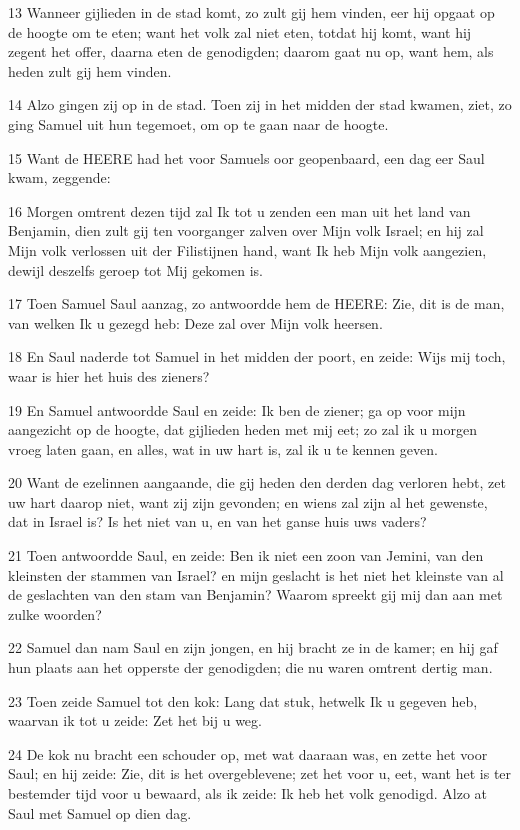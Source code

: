\par 13 Wanneer gijlieden in de stad komt, zo zult gij hem vinden, eer hij opgaat op de hoogte om te eten; want het volk zal niet eten, totdat hij komt, want hij zegent het offer, daarna eten de genodigden; daarom gaat nu op, want hem, als heden zult gij hem vinden.
\par 14 Alzo gingen zij op in de stad. Toen zij in het midden der stad kwamen, ziet, zo ging Samuel uit hun tegemoet, om op te gaan naar de hoogte.
\par 15 Want de HEERE had het voor Samuels oor geopenbaard, een dag eer Saul kwam, zeggende:
\par 16 Morgen omtrent dezen tijd zal Ik tot u zenden een man uit het land van Benjamin, dien zult gij ten voorganger zalven over Mijn volk Israel; en hij zal Mijn volk verlossen uit der Filistijnen hand, want Ik heb Mijn volk aangezien, dewijl deszelfs geroep tot Mij gekomen is.
\par 17 Toen Samuel Saul aanzag, zo antwoordde hem de HEERE: Zie, dit is de man, van welken Ik u gezegd heb: Deze zal over Mijn volk heersen.
\par 18 En Saul naderde tot Samuel in het midden der poort, en zeide: Wijs mij toch, waar is hier het huis des zieners?
\par 19 En Samuel antwoordde Saul en zeide: Ik ben de ziener; ga op voor mijn aangezicht op de hoogte, dat gijlieden heden met mij eet; zo zal ik u morgen vroeg laten gaan, en alles, wat in uw hart is, zal ik u te kennen geven.
\par 20 Want de ezelinnen aangaande, die gij heden den derden dag verloren hebt, zet uw hart daarop niet, want zij zijn gevonden; en wiens zal zijn al het gewenste, dat in Israel is? Is het niet van u, en van het ganse huis uws vaders?
\par 21 Toen antwoordde Saul, en zeide: Ben ik niet een zoon van Jemini, van den kleinsten der stammen van Israel? en mijn geslacht is het niet het kleinste van al de geslachten van den stam van Benjamin? Waarom spreekt gij mij dan aan met zulke woorden?
\par 22 Samuel dan nam Saul en zijn jongen, en hij bracht ze in de kamer; en hij gaf hun plaats aan het opperste der genodigden; die nu waren omtrent dertig man.
\par 23 Toen zeide Samuel tot den kok: Lang dat stuk, hetwelk Ik u gegeven heb, waarvan ik tot u zeide: Zet het bij u weg.
\par 24 De kok nu bracht een schouder op, met wat daaraan was, en zette het voor Saul; en hij zeide: Zie, dit is het overgeblevene; zet het voor u, eet, want het is ter bestemder tijd voor u bewaard, als ik zeide: Ik heb het volk genodigd. Alzo at Saul met Samuel op dien dag.
